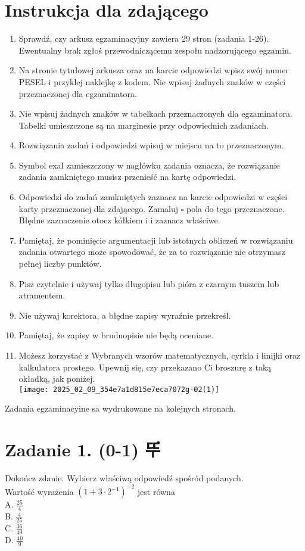 \documentclass[10pt]{article}
\begin{document}
\section*{Instrukcja dla zdającego}
\begin{enumerate}
  \item Sprawdź, czy arkusz egzaminacyjny zawiera 29 stron (zadania 1-26). Ewentualny brak zgłoś przewodniczącemu zespołu nadzorującego egzamin.
  \item Na stronie tytułowej arkusza oraz na karcie odpowiedzi wpisz swój numer PESEL i przyklej naklejkę z kodem. Nie wpisuj żadnych znaków w części przeznaczonej dla egzaminatora.
  \item Nie wpisuj żadnych znaków w tabelkach przeznaczonych dla egzaminatora. Tabelki umieszczone są na marginesie przy odpowiednich zadaniach.
  \item Rozwiązania zadań i odpowiedzi wpisuj w miejscu na to przeznaczonym.
  \item Symbol exal zamieszczony w nagłówku zadania oznacza, że rozwiązanie zadania zamkniętego musisz przenieść na kartę odpowiedzi.
  \item Odpowiedzi do zadań zamkniętych zaznacz na karcie odpowiedzi w części karty przeznaczonej dla zdającego. Zamaluj \(\square\) pola do tego przeznaczone. Błędne zaznaczenie otocz kółkiem i i zaznacz właściwe.
  \item Pamiętaj, że pominięcie argumentacji lub istotnych obliczeń w rozwiązaniu zadania otwartego może spowodować, że za to rozwiązanie nie otrzymasz pełnej liczby punktów.
  \item Pisz czytelnie i używaj tylko długopisu lub pióra z czarnym tuszem lub atramentem.
  \item Nie używaj korektora, a błędne zapisy wyraźnie przekreśl.
  \item Pamiętaj, że zapisy w brudnopisie nie będą oceniane.
  \item Możesz korzystać z Wybranych wzorów matematycznych, cyrkla i linijki oraz kalkulatora prostego. Upewnij się, czy przekazano Ci broszurę z taką okładką, jak poniżej.\\
\texttt{[image: 2025\_02\_09\_354e7a1d815e7eca7072g-02(1)]}
\end{enumerate}

Zadania egzaminacyine sa wydrukowane na kolejnych stronach.

\section*{Zadanie 1. (0-1) 뚜ํ}
Dokończ zdanie. Wybierz właściwą odpowiedź spośród podanych.\\
Wartość wyrażenia \(\left(1+3 \cdot 2^{-1}\right)^{-2}\) jest równa\\
A. \(\frac{25}{4}\)\\
B. \(\frac{4}{25}\)\\
C. \(\frac{36}{49}\)\\
D. \(\frac{40}{9}\)
\end{document}
